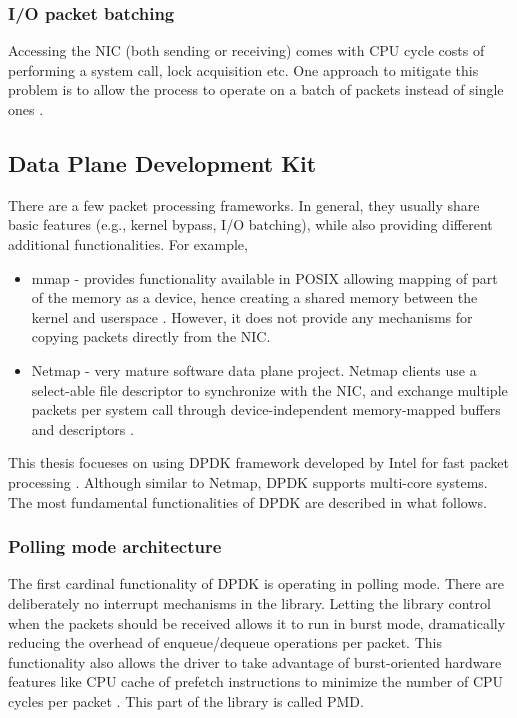 \documentclass[english]{kththesis}
\begin{document}
\subsubsection{I/O packet batching}
Accessing the NIC (both sending or receiving) comes with CPU cycle costs of performing a system call, lock acquisition etc. One approach to mitigate this problem is to allow the process to operate on a batch of packets instead of single ones \cite{barbette_2015}.

\subsection{Data Plane Development Kit}
There are a few packet processing frameworks. In general, they usually share basic features (e.g., kernel bypass, I/O batching), while also providing different additional functionalities. For example,
\begin{itemize}
    \item mmap - provides functionality available in POSIX allowing mapping of part of the memory as a device, hence creating a shared memory between the kernel and userspace \cite{mmap}. However, it does not provide any mechanisms for copying packets directly from the \gls{NIC}.
    \item Netmap - very mature software data plane project. Netmap clients use a select-able file descriptor to synchronize with the \gls{NIC}, and exchange multiple packets per system call through device-independent memory-mapped buffers and descriptors \cite{netmap}.
\end{itemize}

This thesis focueses on using \gls{DPDK} framework developed by Intel for fast packet processing \cite{dpdk}. Although similar to Netmap, \gls{DPDK} supports multi-core systems. The most fundamental functionalities of \gls{DPDK} are described in what follows.

\subsubsection{Polling mode architecture}
The first cardinal functionality of \gls{DPDK} is operating in polling mode. There are deliberately no interrupt mechanisms in the library. Letting the library control when the packets should be received allows it to run in burst mode, dramatically reducing the overhead of enqueue/dequeue operations per packet. This functionality also allows the driver to take advantage of burst-oriented hardware features like CPU cache of prefetch instructions to minimize the number of CPU cycles per packet \cite{pmd}. This part of the library is called \gls{PMD}.
\end{document}
